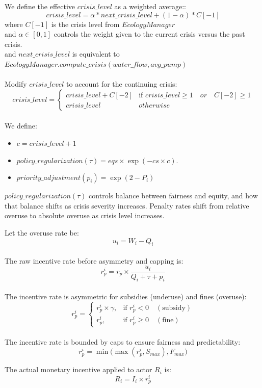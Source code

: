 \documentclass[a4paper, 12pt]{article}
\begin{document}
\noindent We define the effective $crisis\_level$ as a weighted average::
\[
crisis\_level = \alpha * next\_crisis\_level + (1 - \alpha) * C[-1]
\]
where \(C[-1]\) is the crisis level from $EcologyManager$ \\
\quad and \(\alpha \in [0,1]\) controls the weight given to the current crisis versus the past crisis.\\
\quad and  $next\_crisis\_level$ is equivalent to $EcologyManager.compute\_crisis(water\_flow, avg\_pump)$
\\ \\ 
Modify $crisis\_level$ to account for the continuing crisis:
\[
crisis\_level = \begin{cases}crisis\_level + C[-2] & \text{if }crisis\_level \geq 1 \quad or \quad C[-2] \geq 1 \\
    crisis\_level & otherwise
\end{cases}
\]
\\

\noindent We define:
\begin{itemize}
    \item $c = crisis\_level + 1$
    \item $policy\_regularization(\tau) = eqs \times \exp(-cs \times c)$.
    \item $priority\_adjustment (p_i) = \exp(2 - P_i)$
\end{itemize} 
$policy\_regularization(\tau)$ controls balance between fairness and equity, and how that balance shifts as crisis severity increases.
Penalty rates shift from relative overuse to absolute overuse as crisis level increases. 

\noindent Let the overuse rate be:
\[
    u_i = W_i - Q_i
\]
\\
\noindent The raw incentive rate before asymmetry and capping is:
\[
r_p^{i} = r_p \times \frac{u_i}{Q_i +  \tau + p_i}
\]
\\
\noindent The incentive rate is asymmetric for subsidies (underuse) and fines (overuse):
\[
r_p^{i} =
\begin{cases}
r_p^{i} \times \gamma, & \text{if } r_p^{i} < 0 \quad (\text{subsidy}) \\
r_p^{i}, & \text{if } r_p^{i} \geq 0 \quad (\text{fine})
\end{cases}
\]
\\
\noindent The incentive rate is bounded by caps to ensure fairness and predictability:
\[
r_p^{i} = \min\big(\max(r_p^{i}, S_{max}), F_{max}\big)
\]

\noindent The actual monetary incentive applied to actor $R_i$ is:
\[
R_i = I_i \times r_p^{i}
\]
\end{document}
